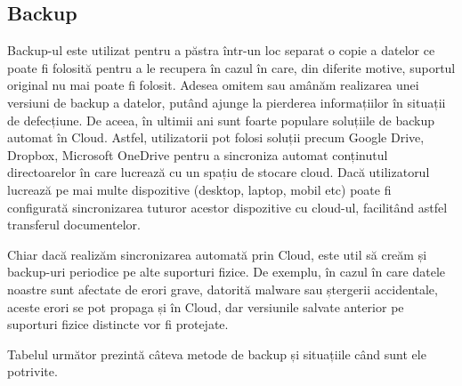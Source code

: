 \subsection{Backup}
\label{sec:file-system-backup}

Backup-ul este utilizat pentru a păstra într-un loc separat o copie a datelor ce
poate fi folosită pentru a le recupera în cazul în care, din diferite motive,
suportul original nu mai poate fi folosit. Adesea omitem sau amânăm realizarea
unei versiuni de backup a datelor, putând ajunge la pierderea informațiilor în
situații de defecțiune. De aceea, în ultimii ani sunt foarte populare soluțiile
de backup automat în Cloud. Astfel, utilizatorii pot folosi soluții precum
Google Drive, Dropbox, Microsoft OneDrive pentru a sincroniza automat conținutul
directoarelor în care lucrează cu un spațiu de stocare cloud. Dacă utilizatorul
lucrează pe mai multe dispozitive (desktop, laptop, mobil etc) poate fi
configurată sincronizarea tuturor acestor dispozitive cu cloud-ul, facilitând
astfel transferul documentelor.

Chiar dacă realizăm sincronizarea automată prin Cloud, este util să creăm și
backup-uri periodice pe alte suporturi fizice. De exemplu, în cazul în care
datele noastre sunt afectate de erori grave, datorită malware sau ștergerii
accidentale, aceste erori se pot propaga și în Cloud, dar versiunile salvate
anterior pe suporturi fizice distincte vor fi protejate.

Tabelul următor prezintă câteva metode de backup și situațiile când sunt ele
potrivite.

